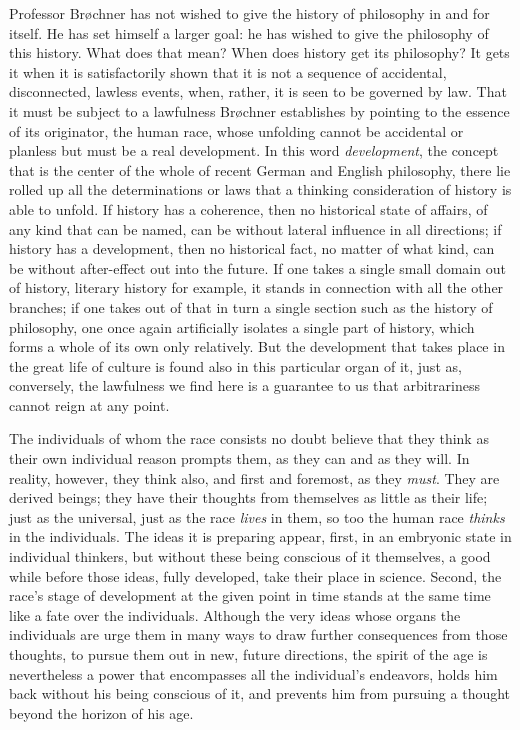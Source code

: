 \documentclass[12pt,a4paper,openany]{book}
\newcommand{\opage}[1]{\marginnote{\footnotesize\textit{[#1]}}}
\begin{document}
Professor Brøchner has not wished to give the history of
philosophy in and for itself. He has set himself a larger goal:
he has wished to give the philosophy of this history. What does
that mean? When does history get its philosophy? It gets it when
it is satisfactorily shown that it is not a sequence of
accidental, disconnected,
\opage{118}lawless events, when, rather, it is seen to be governed by law. That
it must be subject to a lawfulness Brøchner establishes by
pointing to the essence of its originator, the human race, whose
unfolding cannot be accidental or planless but must be a real
development. In this word \emph{development}, the concept that is
the center of the whole of recent German and English philosophy,
there lie rolled up all the determinations or laws that a thinking
consideration of history is able to unfold. If history has a
coherence, then no historical state of affairs, of any kind that
can be named, can be without lateral influence in all directions;
if history has a development, then no historical fact, no matter
of what kind, can be without after-effect out into the future. If
one takes a single small domain out of history, literary history
for example, it stands in connection with all the other branches;
if one takes out of that in turn a single section such as the
history of philosophy, one once again artificially isolates a
single part of history, which forms a whole of its own only
relatively. But the development that takes place in the great life
of culture is found also in this particular organ of it, just as,
conversely, the lawfulness we find here is a guarantee to us that
arbitrariness cannot reign at any point.

The individuals of whom the race consists no doubt believe
that they think as their own individual reason prompts them, as
they can and as they will. In reality, however, they think also,
and first and foremost, as they \emph{must}. They are derived
beings; they have their thoughts from themselves as little as
their life; just as the universal, just as the race \emph{lives}
in them, so too the human race \emph{thinks} in the individuals.
The ideas it is preparing appear, first, in an embryonic state in
individual thinkers, but without these being conscious of it
themselves, a good while before those ideas, fully developed, take
their place in science. Second, the race's stage of development at
the given point in time stands at the same time like a fate over
the individuals. Although the very ideas whose organs the
individuals are urge them in many ways to draw further
consequences from those thoughts, to pursue them out in new,
future directions, the spirit of the age is nevertheless a power
that encompasses all the individual's endeavors, holds him back
without his being conscious of it, and prevents him from pursuing
a thought beyond the horizon of his age.
\end{document}
